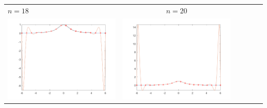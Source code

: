 \begin{tabular}{l*{5}{c}}
\hspace{3.5cm}\(n=18\) &  \(n=20\) \\
\includegraphics[scale=0.5]{cap4/4_9/18.png} &  \includegraphics[scale=0.5]{cap4/4_9/20.png} \\


\end{tabular}
